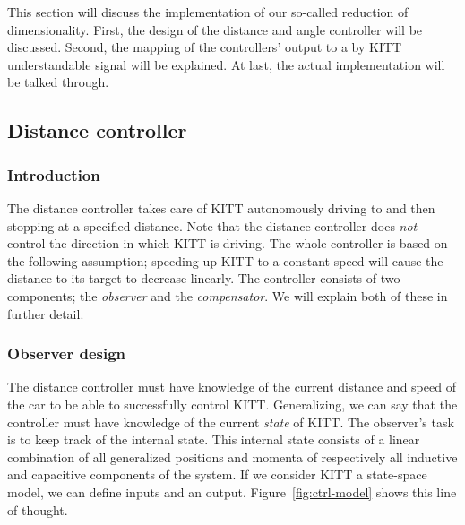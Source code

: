 \documentclass[11pt,titlepage]{report}
\begin{document}
This section will discuss the implementation of our so-called reduction of dimensionality. First, the design of the distance and angle controller will be discussed. Second, the mapping of the controllers' output to a by KITT understandable signal will be explained. At last, the actual implementation will be talked through.


\subsection{Distance controller}
\subsubsection{Introduction}
The distance controller takes care of KITT autonomously driving to and then stopping at a specified distance. Note that the distance controller does \textit{not} control the direction in which KITT is driving. The whole controller is based on the following assumption; speeding up KITT to a constant speed will cause the distance to its target to decrease linearly. The controller consists of two components; the \textit{observer} and the \textit{compensator}. We will explain both of these in further detail.

\subsubsection{Observer design}
The distance controller must have knowledge of the current distance and speed of the car to be able to successfully control KITT. Generalizing, we can say that the controller must have knowledge of the current \textit{state} of KITT. The observer's task is to keep track of the internal state. This internal state consists of a linear combination of all generalized positions and momenta of respectively all inductive and capacitive components of the system. If we consider KITT a state-space model, we can define inputs and an output. Figure~\ref{fig:ctrl-model} shows this line of thought.
\end{document}
